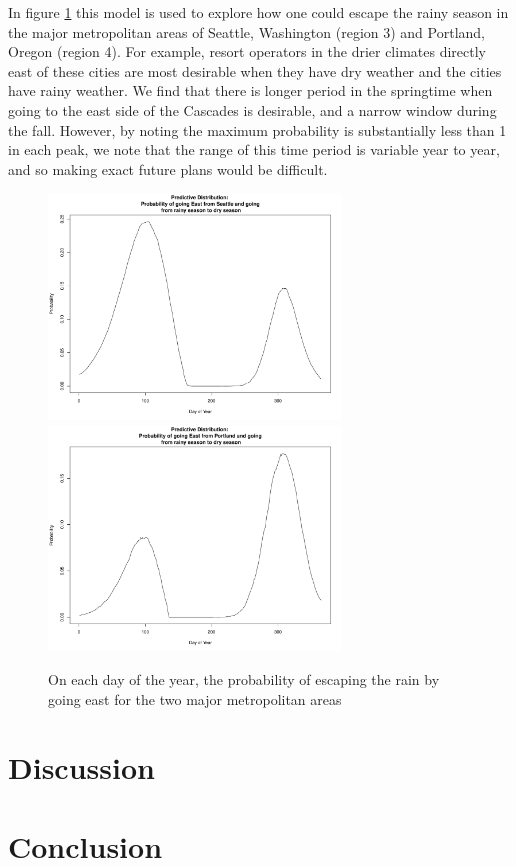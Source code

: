 \documentclass{article}
\begin{document}
In figure \ref{fig:goingeast} this model is used to explore how one could escape the rainy season in the major metropolitan areas of Seattle, Washington (region 3) and Portland, Oregon (region 4). 
For example, resort operators in the drier climates directly east of these cities are most desirable when they have dry weather and the cities have rainy weather.  
We find that there is longer period in the springtime when going to the east side of the Cascades is desirable, and  a narrow window during the fall. 
However, by noting the maximum probability is substantially less than 1 in each peak, we note that the range of this time period is variable year to year, and so making exact future plans would be difficult.




\begin{figure}[h!]
\centering
\includegraphics[width = .4\textwidth, height = 6cm]{SeattleGoingEast}
\includegraphics[width = .4\textwidth, height = 6cm]{PortlandGoingEast}
\caption{On each day of the year, the probability of escaping the rain by going east for the two major metropolitan areas }
\label{fig:goingeast}
\end{figure}




\section{Discussion}

\section{Conclusion}
\end{document}
